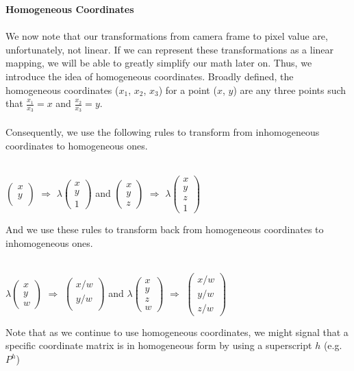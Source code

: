 \documentclass[]{article}
\begin{document}
\textbf{Homogeneous Coordinates}\\\\
We now note that our transformations from camera frame to pixel value are, unfortunately, not linear. If we can represent these transformations as a linear mapping, we will be able to greatly simplify our math later on. Thus, we introduce the idea of homogeneous coordinates. Broadly defined, the homogeneous coordinates ($x_1$, $x_2$, $x_3$) for a point ($x$, $y$) are any three points such that $\frac{x_1}{x_3} = x$ and $\frac{x_2}{x_3} = y$.\\\\ Consequently, we use the following rules to transform from inhomogeneous coordinates to homogeneous ones.\\\\
\begin{center}
$\begin{pmatrix} 
x \\
y \\
\end{pmatrix}
$
$\Rightarrow$
$\lambda\begin{pmatrix} 
x \\
y \\
1
\end{pmatrix}
$
and 
$\begin{pmatrix} 
x \\
y \\
z
\end{pmatrix}
$
$\Rightarrow$
$\lambda\begin{pmatrix} 
x \\
y \\
z \\
1
\end{pmatrix}
$
\end{center}
And we use these rules to transform back from homogeneous coordinates to inhomogeneous ones. \\\\
\begin{center}
$\lambda\begin{pmatrix} 
x \\
y \\
w
\end{pmatrix}
$
$\Rightarrow$
$\begin{pmatrix} 
x/w \\
y/w \\
\end{pmatrix}
$
and 
$\lambda\begin{pmatrix} 
x \\
y \\
z \\
w
\end{pmatrix}
$
$\Rightarrow$
$\begin{pmatrix} 
x/w \\
y/w \\
z/w
\end{pmatrix}
$
\end{center}
Note that as we continue to use homogeneous coordinates, we might signal that a specific coordinate matrix is in homogeneous form by using a superscript $h$ (e.g. $P^h$)
\end{document}
